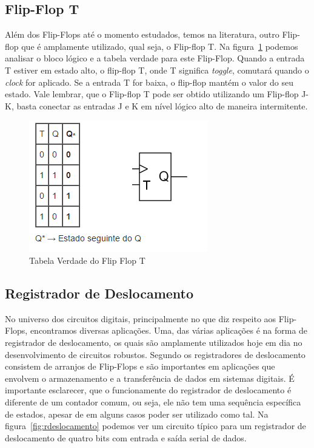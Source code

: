 \documentclass[12pt]{article}
\begin{document}
\subsection{Flip-Flop T}

Além dos Flip-Flops até o momento estudados, temos na literatura, outro Flip-flop que é amplamente utilizado, qual seja, o Flip-flop T. Na figura~\ref{fig:fft} podemos analisar o bloco lógico e a tabela verdade para este Flip-Flop. Quando a entrada T estiver em estado alto, o flip-flop T, onde T significa \textit{toggle}, comutará quando o \textit{clock} for aplicado. Se a entrada T for baixa, o flip-flop mantém o valor do seu estado. Vale lembrar, que o Flip-flop T pode ser obtido utilizando um Flip-flop J-K, basta conectar as entradas J e K em nível lógico alto de maneira intermitente.  

\begin{figure}[h]
\centering
\includegraphics[width=.5\textwidth]{img/fig4Flip-Flopt.png}
\caption{Tabela Verdade do Flip Flop T}
\label{fig:fft}
\end{figure}

\subsection{Registrador de Deslocamento}

No universo dos circuitos digitais, principalmente no que diz respeito aos Flip-Flops, encontramos diversas aplicações. Uma, das várias aplicações é na forma de registrador de deslocamento, os quais são amplamente utilizados hoje em dia no desenvolvimento de circuitos robustos. Segundo \cite{floyd2011digital} os registradores de deslocamento consistem de arranjos de Flip-Flops e são importantes em aplicações que envolvem o armazenamento e a transferência de dados em sistemas digitais. É importante esclarecer, que o funcionamente do registrador de deslocamento é diferente de um contador comum, ou seja, ele não tem uma sequência específica de estados, apesar de em alguns casos poder ser utilizado como tal. Na figura~\ref{fig:rdeslocamento} podemos ver um circuito típico para um registrador de deslocamento de quatro bits com entrada e saída serial de dados.
\end{document}
